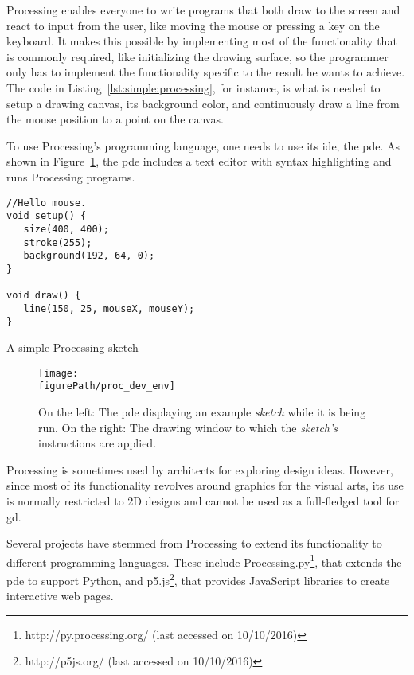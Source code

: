 Processing enables everyone to write programs that both draw to the screen and react to input from the user, like moving the mouse or pressing a key on the keyboard.
It makes this possible by implementing most of the functionality that is commonly required, like initializing the drawing surface, so the programmer only has to implement the functionality specific to the result he wants to achieve.
The code in Listing~\ref{lst:simple:processing}, for instance, is what is needed to setup a drawing canvas, its background color, and continuously draw a line from the mouse position to a point on the canvas.

To use Processing's programming language, one needs to use its \gls{ide}, the \acrfull{pde}.
As shown in Figure~\ref{fig:proc:dev:env}, the \gls{pde} includes a text editor with syntax highlighting and runs Processing programs.

\begin{listing}
\begin{verbatim}
//Hello mouse.
void setup() {
   size(400, 400);
   stroke(255);
   background(192, 64, 0);
}

void draw() {
   line(150, 25, mouseX, mouseY);
}
\end{verbatim}
	\caption[A simple Processing sketch]{A simple Processing sketch}
	\label{lst:simple:processing}
\end{listing}

\begin{figure}
	\centering
	\texttt{[image: \\figurePath/proc\_dev\_env]}
	\caption{On the left: The \gls{pde} displaying an example \emph{sketch} while it is being run. On the right: The drawing window to which the \emph{sketch's} instructions are applied.}
	\label{fig:proc:dev:env}
\end{figure}

Processing is sometimes used by architects for exploring design ideas.
However, since most of its functionality revolves around graphics for the visual arts, its use is normally restricted to 2D designs and cannot be used as a full-fledged tool for \gls{gd}.

Several projects have stemmed from Processing to extend its functionality to different programming languages.
These include Processing.py\footnote{http://py.processing.org/ (last accessed on 10/10/2016)}, that extends the \gls{pde} to support Python, and p5.js\footnote{http://p5js.org/ (last accessed on 10/10/2016)}, that provides JavaScript libraries to create interactive web pages.


